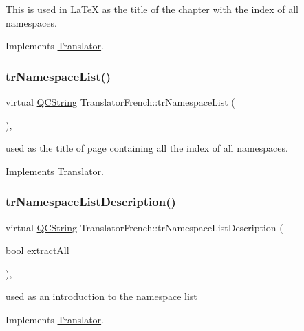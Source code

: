 This is used in La\+TeX as the title of the chapter with the index of all namespaces. 

Implements \mbox{\hyperlink{class_translator}{Translator}}.

\mbox{\label{class_translator_french_a7c547fca9a794fa8a1b48390949f613a}} 
\subsubsection{\texorpdfstring{trNamespaceList()}{trNamespaceList()}}
{\footnotesize\ttfamily virtual \mbox{\hyperlink{class_q_c_string}{Q\+C\+String}} Translator\+French\+::tr\+Namespace\+List (\begin{DoxyParamCaption}{ }\end{DoxyParamCaption})\hspace{0.3cm}{\ttfamily [inline]}, {\ttfamily [virtual]}}

used as the title of page containing all the index of all namespaces. 

Implements \mbox{\hyperlink{class_translator}{Translator}}.

\mbox{\label{class_translator_french_ae9a7f8a8c0459193e96d46330866e78d}} 
\subsubsection{\texorpdfstring{trNamespaceListDescription()}{trNamespaceListDescription()}}
{\footnotesize\ttfamily virtual \mbox{\hyperlink{class_q_c_string}{Q\+C\+String}} Translator\+French\+::tr\+Namespace\+List\+Description (\begin{DoxyParamCaption}\item[{bool}]{extract\+All }\end{DoxyParamCaption})\hspace{0.3cm}{\ttfamily [inline]}, {\ttfamily [virtual]}}

used as an introduction to the namespace list 

Implements \mbox{\hyperlink{class_translator}{Translator}}.

